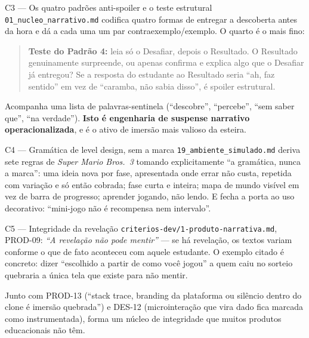 \documentclass[11pt,a4paper]{article}
\begin{document}
\begin{creditobox}{C3 --- Os quatro padr\~oes anti-spoiler e o teste estrutural}
\texttt{01\_nucleo\_narrativo.md} codifica quatro formas de entregar a descoberta antes da hora e
d\'a a cada uma um par contraexemplo/exemplo. O quarto \'e o mais fino:

\begin{quote}\small
\textbf{Teste do Padr\~ao 4:} leia s\'o o Desafiar, depois o Resultado. O Resultado genuinamente
surpreende, ou apenas confirma e explica algo que o Desafiar j\'a entregou? Se a resposta do
estudante ao Resultado seria ``ah, faz sentido'' em vez de ``caramba, n\~ao sabia disso'', \'e
spoiler estrutural.
\end{quote}

Acompanha uma lista de palavras-sentinela (``descobre'', ``percebe'', ``sem saber que'', ``na
verdade''). \textbf{Isto \'e engenharia de suspense narrativo operacionalizada}, e \'e o ativo de
imers\~ao mais valioso da esteira.
\end{creditobox}

\begin{creditobox}{C4 --- Gram\'atica de level design, sem a marca}
\texttt{19\_ambiente\_simulado.md} deriva sete regras de \emph{Super Mario Bros.\ 3} tomando
explicitamente ``a gram\'atica, nunca a marca'': uma ideia nova por fase, apresentada onde errar
n\~ao custa, repetida com varia\c{c}\~ao e s\'o ent\~ao cobrada; fase curta e inteira; mapa de
mundo vis\'ivel em vez de barra de progresso; aprender jogando, n\~ao lendo. E fecha a porta ao
uso decorativo: ``mini-jogo n\~ao \'e recompensa nem intervalo''.
\end{creditobox}

\begin{creditobox}{C5 --- Integridade da revela\c{c}\~ao}
\texttt{criterios-dev/1-produto-narrativa.md}, PROD-09: \emph{``A revela\c{c}\~ao n\~ao pode
mentir''} --- se h\'a revela\c{c}\~ao, os textos variam conforme o que de fato aconteceu com
aquele estudante. O exemplo citado \'e concreto: dizer ``escolhido a partir de como voc\^e jogou''
a quem caiu no sorteio quebraria a \'unica tela que existe para n\~ao mentir.

Junto com PROD-13 (``stack trace, branding da plataforma ou sil\^encio dentro do clone \'e
imers\~ao quebrada'') e DES-12 (microintera\c{c}\~ao que vira dado fica marcada como
instrumentada), forma um n\'ucleo de integridade que muitos produtos educacionais n\~ao t\^em.
\end{creditobox}
\end{document}
